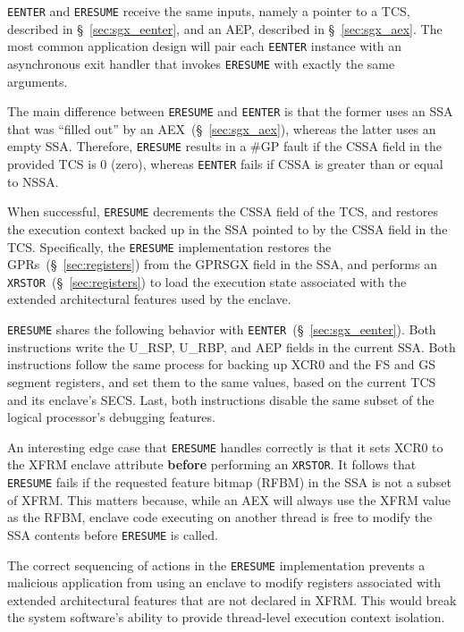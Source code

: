 \texttt{EENTER} and \texttt{ERESUME} receive the same inputs, namely a pointer
to a TCS, described in \S~\ref{sec:sgx_eenter}, and an AEP, described in
\S~\ref{sec:sgx_aex}. The most common application design will pair each
\texttt{EENTER} instance with an asynchronous exit handler that invokes
\texttt{ERESUME} with exactly the same arguments.

The main difference between \texttt{ERESUME} and \texttt{EENTER} is that the
former uses an SSA that was ``filled out'' by an AEX~(\S~\ref{sec:sgx_aex}),
whereas the latter uses an empty SSA. Therefore, \texttt{ERESUME} results in a
\#GP fault if the CSSA field in the provided TCS is 0 (zero), whereas
\texttt{EENTER} fails if CSSA is greater than or equal to NSSA.

When successful, \texttt{ERESUME} decrements the CSSA field of the TCS, and
restores the execution context backed up in the SSA pointed to by the CSSA field
in the TCS. Specifically, the \texttt{ERESUME} implementation restores the
GPRs~(\S~\ref{sec:registers}) from the GPRSGX field in the SSA, and performs an
\texttt{XRSTOR}~(\S~\ref{sec:registers}) to load the execution state
associated with the extended architectural features used by the enclave.

\texttt{ERESUME} shares the following behavior with
\texttt{EENTER}~(\S~\ref{sec:sgx_eenter}). Both instructions write the U\_RSP,
U\_RBP, and AEP fields in the current SSA. Both instructions follow the same
process for backing up XCR0 and the FS and GS segment registers, and set them
to the same values, based on the current TCS and its enclave's SECS. Last, both
instructions disable the same subset of the logical processor's debugging
features.

An interesting edge case that \texttt{ERESUME} handles correctly is that it
sets XCR0 to the XFRM enclave attribute \textbf{before} performing an
\texttt{XRSTOR}. It follows that \texttt{ERESUME} fails if the requested
feature bitmap (RFBM) in the SSA is not a subset of XFRM. This matters because,
while an AEX will always use the XFRM value as the RFBM, enclave code executing
on another thread is free to modify the SSA contents before \texttt{ERESUME} is
called.

The correct sequencing of actions in the \texttt{ERESUME} implementation
prevents a malicious application from using an enclave to modify registers
associated with extended architectural features that are not declared in XFRM.
This would break the system software's ability to provide thread-level
execution context isolation.
